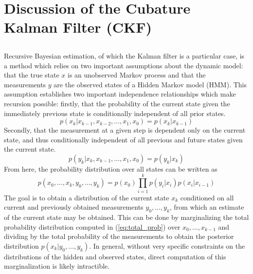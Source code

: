 \section{Discussion of the Cubature Kalman Filter (CKF)}
\label{sec:ckf}

\subsection{}

Recursive Bayesian estimation, of which the Kalman filter is a particular case, is a method which relies on two important assumptions about the dynamic model: that the true state $x$ is an unobserved Markov process and that the measurements $y$ are the observed states of a Hidden Markov model (HMM). This assumption establishes two important independence relationships which make recursion possible: firstly, that the probability of the current state given the immediately previous state is conditionally independent of all prior states.
\begin{equation} \label{eq:mark1}
    p(x_{k}|x_{k-1}, x_{k-2}, \hdots, x_{1}, x_{0}) = p(x_{k}|x_{k-1})
\end{equation}
Secondly, that the measurement at a given step is dependent only on the current state, and thus conditionally independent of all previous and future states given the current state.
\begin{equation} \label{eq:mark2}
    p(y_{k}|x_{k}, x_{k-1}, \hdots, x_{1}, x_{0}) = p(y_{k}|x_{k})
\end{equation}
From here, the probability distribution over all states can be written as
\begin{equation} \label{eq:total_prob}
    p(x_{0}, \hdots, x_{k}, y_{0}, \hdots, y_{k}) = p(x_{0}) \prod_{i=1}^{k} p(y_{i}|x_{i})p(x_{i}|x_{i-1})
\end{equation}
The goal is to obtain a distribution of the current state $x_{k}$ conditioned on all current and previously obtained measurements $y_{0}, \hdots, y_{k}$, from which an estimate of the current state may be obtained. This can be done by marginalizing the total probability distribution computed in (\ref{eq:total_prob}) over $x_{0}, \hdots, x_{k-1}$ and dividing by the total probability of the measurements to obtain the posterior distribution $p(x_{k}|y_{0}, \hdots, y_{k})$. In general, without very specific constraints on the distributions of the hidden and observed states, direct computation of this marginalization is likely intractible.

